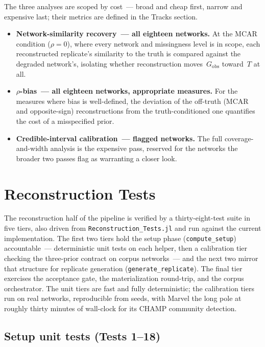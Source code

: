 \documentclass[11pt]{article}
\newcommand{\Gobs}{G_{\text{obs}}}
\begin{document}
The three analyses are scoped by cost~--- broad and cheap first, narrow and expensive last; their metrics are defined in the Tracks section.
\begin{itemize}[leftmargin=*, itemsep=3pt]
  \item \textbf{Network-similarity recovery~--- all eighteen networks.} At the MCAR condition ($\rho = 0$), where every network and missingness level is in scope, each reconstructed replicate's similarity to the truth is compared against the degraded network's, isolating whether reconstruction moves~$\Gobs$ toward~$T$ at all.
  \item \textbf{$\rho$-bias~--- all eighteen networks, appropriate measures.} For the measures where bias is well-defined, the deviation of the off-truth (MCAR and opposite-sign) reconstructions from the truth-conditioned one quantifies the cost of a misspecified prior.
  \item \textbf{Credible-interval calibration~--- flagged networks.} The full coverage-and-width analysis is the expensive pass, reserved for the networks the broader two passes flag as warranting a closer look.
\end{itemize}

\section{Reconstruction Tests}

The reconstruction half of the pipeline is verified by a thirty-eight-test suite in five tiers, also driven from \texttt{Reconstruction\_Tests.jl} and run against the current implementation. The first two tiers hold the setup phase (\texttt{compute\_setup}) accountable~--- deterministic unit tests on each helper, then a calibration tier checking the three-prior contract on corpus networks~--- and the next two mirror that structure for replicate generation (\texttt{generate\_replicate}). The final tier exercises the acceptance gate, the materialization round-trip, and the corpus orchestrator. The unit tiers are fast and fully deterministic; the calibration tiers run on real networks, reproducible from seeds, with Marvel the long pole at roughly thirty minutes of wall-clock for its CHAMP community detection.

\subsection{Setup unit tests (Tests 1--18)}
\end{document}
